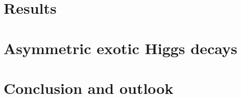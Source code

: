 \documentclass[12pt,lot,lof]{puthesis}
\begin{document}
\chapter{Results}


\chapter{Asymmetric exotic Higgs decays}


\chapter{Conclusion and outlook}

% 

 \label{bib}
\end{document}
